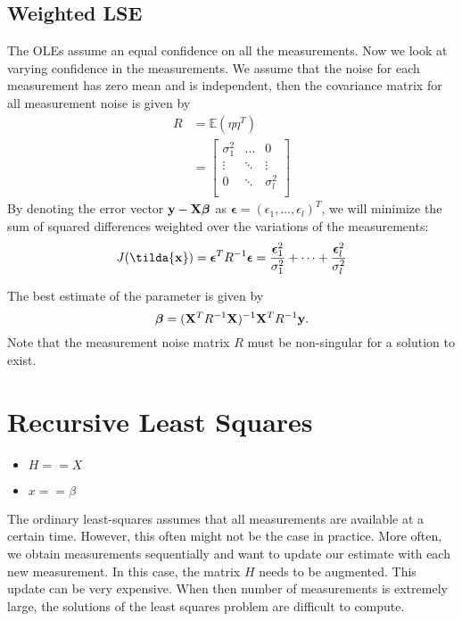 \subsection{Weighted LSE}
The OLEs assume an equal confidence on all the measurements. Now we look at varying confidence in the measurements. We assume that the noise for each measurement has zero mean and is independent, then the covariance matrix for all measurement noise is given by
\begin{align*}
	R &= \mathbb{E}(\eta\eta^T)\\
	  &= \begin{bmatrix}
		  \sigma_1^2 & \dots & 0\\
		  \vdots & \ddots & \vdots\\
		  0 & \ddots & \sigma_l^2\\
	  \end{bmatrix}
\end{align*}
By denoting the error vector ${\mathbf{y}}-\mathbf{X}\boldsymbol{\beta}$ as $\boldsymbol{\epsilon} = (\epsilon_1, \dots, \epsilon_l)^T$, we will minimize the sum of squared differences weighted over the variations of the measurements:
$$J(\tilda{\rvx}) = \boldsymbol{\epsilon}^TR^{-1}\boldsymbol{\epsilon}=\frac{\boldsymbol{\epsilon}_1^2}{\sigma_1^2}+\dots+\frac{\boldsymbol{\epsilon}_l^2}{\sigma_l^2}$$

The best estimate of the parameter is given by
$$\boldsymbol{\beta} = (\mathbf{X}^TR^{-1}\mathbf{X})^{-1}\mathbf{X}^TR^{-1}{\mathbf{y}}.$$
Note that the measurement noise matrix $R$ must be non-singular for a solution to exist.

\section{Recursive Least Squares}
\label{sec:recursive_least_square}

\begin{itemize}
	\item $H==X$
	\item $x==\beta$
\end{itemize}

The ordinary least-squares assumes that all measurements are available at a certain time. However, this often might not be the case in practice. More often, we obtain measurements sequentially and want to update our estimate with each new measurement. In this case, the matrix $H$ needs to be augmented. This update can be very expensive. When then number of measurements is extremely large, the solutions of the least squares problem are difficult to compute. 

